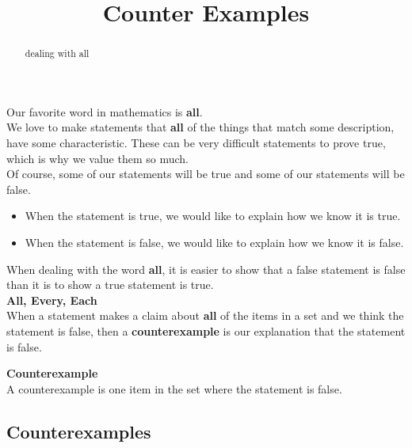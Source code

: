 \documentclass{ximera}
\title{Counter Examples}
\begin{document}
\begin{abstract}
dealing with all
\end{abstract}
\maketitle




Our favorite word in mathematics is \textbf{\textcolor{blue!55!black}{all}}. \\


We love to make statements that \textbf{all} of the things that match some description, have some characteristic. These can be very difficult statements to prove true, which is why we value them so much. \\


Of course, some of our statements will be true and some of our statements will be false.

\begin{itemize}
\item When the statement is true, we would like to explain how we know it is true.
\item When the statement is false, we would like to explain how we know it is false.
\end{itemize}



When dealing with the word \textbf{all}, it is easier to show that a false statement is false than it is to show a true statement is true. \\


\textbf{\textcolor{blue!55!black}{All, Every, Each}} \\

When a statement makes a claim about \textbf{\textcolor{red!80!black}{all}} of the items in a set and we think the statement is false, then a \textbf{counterexample} is our explanation that the statement is false.



\begin{definition}  \textbf{\textcolor{green!50!black}{Counterexample}} \\


A counterexample is one item in the set where the statement is false.


\end{definition}




\subsection{Counterexamples}
\end{document}

